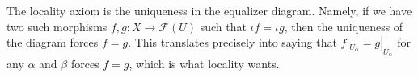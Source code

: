 \documentclass[../notes.tex]{subfiles}
\begin{document}
The locality axiom is the uniqueness in the equalizer diagram. Namely, if we have two such morphisms $f,g:X\to\mathcal F(U)$ such that $\iota f=\iota g$, then the uniqueness of the diagram forces $f=g$. This translates precisely into saying that $f|_{U_\alpha}=g|_{U_\alpha}$ for any $\alpha$ and $\beta$ forces $f=g$, which is what locality wants.
\end{document}
